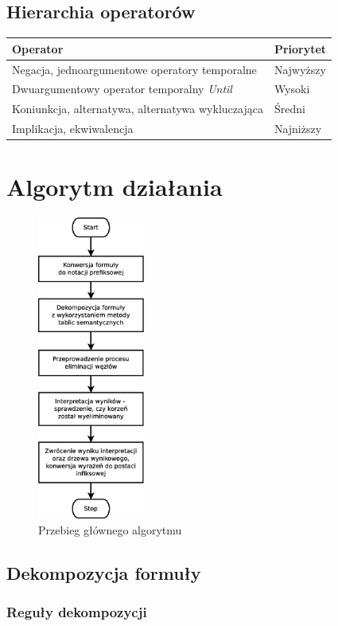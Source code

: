 \documentclass[12pt,a4paper,titlepage]{article}
\begin{document}
\subsection{Hierarchia operatorów}
\begin{tabular}{|C{5cm}|C{5cm}|}
  \hline
  \textbf{Operator} & \textbf{Priorytet}\\
  \hline
  Negacja, jednoargumentowe operatory temporalne & Najwyższy\\
  \hline
  Dwuargumentowy operator temporalny \textit{Until} & Wysoki\\ 
  \hline
  Koniunkcja, alternatywa, alternatywa wykluczająca & Średni\\
  \hline
  Implikacja, ekwiwalencja & Najniższy\\
  \hline
\end{tabular}

\section{Algorytm działania}

\begin{figure}[!htb]
\centering
\includegraphics[height=10cm]{main_alg}
\caption{Przebieg głównego algorytmu}
\end{figure}

\subsection{Dekompozycja formuły}

\subsubsection{Reguły dekompozycji}
\label{dekompozycja}
\end{document}
